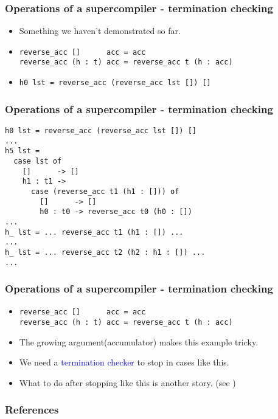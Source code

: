 \documentclass{beamer}
\begin{document}
\begin{frame}[fragile]

    \frametitle{Operations of a supercompiler - termination checking}

    \begin{itemize}[<+->]
        \item[] Something we haven't demonstrated so far.

        \item[]
            \begin{verbatim}
reverse_acc []      acc = acc
reverse_acc (h : t) acc = reverse_acc t (h : acc)
            \end{verbatim}

        \item[]
            \begin{verbatim}
h0 lst = reverse_acc (reverse_acc lst []) []
            \end{verbatim}
    \end{itemize}
\end{frame}

\begin{frame}[fragile]
    \frametitle{Operations of a supercompiler - termination checking}
    \begin{verbatim}
h0 lst = reverse_acc (reverse_acc lst []) []
...
h5 lst =
  case lst of
    []      -> []
    h1 : t1 ->
      case (reverse_acc t1 (h1 : [])) of
        []      -> []
        h0 : t0 -> reverse_acc t0 (h0 : [])
...
h_ lst = ... reverse_acc t1 (h1 : []) ...
...
h_ lst = ... reverse_acc t2 (h2 : h1 : []) ...
...
    \end{verbatim}
\end{frame}


\begin{frame}[fragile]
    \frametitle{Operations of a supercompiler - termination checking}
    \begin{itemize}[<+->]
        \item[]
            \begin{verbatim}
reverse_acc []      acc = acc
reverse_acc (h : t) acc = reverse_acc t (h : acc)
            \end{verbatim}

        \item[] The growing argument(accumulator) makes this example tricky.
        \item[] We need a \textcolor{blue}{termination checker} to stop in cases
            like this.
        \item[] What to do after stopping like this is another story.\newline
            (see \citet{callbyneed-sc})

    \end{itemize}

\end{frame}

\begin{frame}

\end{frame}

\begin{frame}[allowframebreaks]
    \frametitle{References}

    
    
\end{frame}
\end{document}
